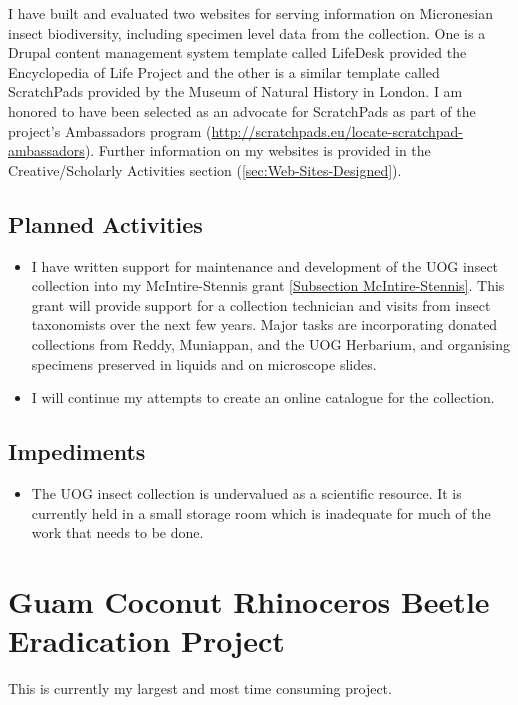 \documentclass[12pt,oneside,english]{scrbook}
\begin{document}
I have built and evaluated two websites for serving information on
Micronesian insect biodiversity, including specimen level data from
the collection. One is a Drupal content management system template
called LifeDesk provided the Encyclopedia of Life Project and the
other is a similar template called ScratchPads provided by the Museum
of Natural History in London. I am honored to have been selected as
an advocate for ScratchPads as part of the project's Ambassadors program
(\url{http://scratchpads.eu/locate-scratchpad-ambassadors}). Further information
on my websites is provided in the Creative/Scholarly Activities section
(\ref{sec:Web-Sites-Designed}). 

\subsection{Planned Activities}

\begin{itemize}
\item I have written support for maintenance and development of the UOG insect collection into my McIntire-Stennis grant \ref{Subsection McIntire-Stennis}. This grant will provide support for a collection technician and visits from insect taxonomists over the next few years. Major tasks are incorporating donated collections from Reddy, Muniappan, and the UOG Herbarium, and organising specimens preserved in liquids and on microscope slides.
\item I will continue my attempts to create an online catalogue for the collection.
\end{itemize}

\subsection{Impediments}

\begin{itemize}
\item The UOG insect collection is undervalued as a scientific resource. It is currently held in a small storage room which is inadequate for much of the work that needs to be done.
\end{itemize}

\section{Guam Coconut Rhinoceros Beetle Eradication Project}

This is currently my largest and most time consuming project. 
\end{document}
